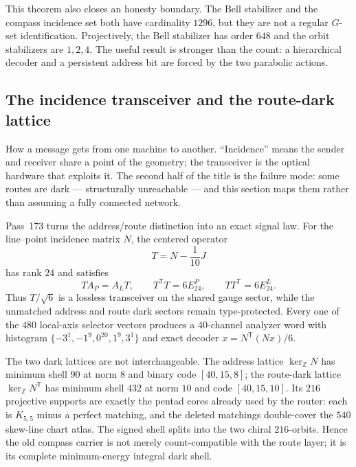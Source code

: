 \documentclass[11pt]{article}
\begin{document}
This theorem also closes an honesty boundary.  The Bell stabilizer and
the compass incidence set both have cardinality $1296$, but they are
not a regular $G$-set identification.  Projectively, the Bell
stabilizer has order $648$ and the orbit stabilizers are $1,2,4$.
The useful result is stronger than the count: a hierarchical decoder
and a persistent address bit are forced by the two parabolic actions.

\subsection{The incidence transceiver and the route-dark lattice}

\begin{plainbox}
How a message gets from one machine to another. ``Incidence'' means the sender and
receiver share a point of the geometry; the transceiver is the optical hardware that
exploits it. The second half of the title is the failure mode: some routes are dark ---
structurally unreachable --- and this section maps them rather than assuming a fully
connected network.
\end{plainbox}

\label{sec:incidence-transceiver-route-dark}

Pass~173 turns the address/route distinction into an exact signal law.
For the line--point incidence matrix $N$, the centered operator
\[
 T=N-\frac1{10}J
\]
has rank $24$ and satisfies
\[
 TA_P=A_LT,
 \qquad T^{\mathsf T}T=6E_{24}^{P},
 \qquad TT^{\mathsf T}=6E_{24}^{L}.
\]
Thus $T/\sqrt6$ is a lossless transceiver on the shared gauge sector,
while the unmatched address and route dark sectors remain type-protected.
Every one of the $480$ local-axis selector vectors produces a
$40$-channel analyzer word with histogram
$\{-3^1,-1^9,0^{20},1^9,3^1\}$ and exact decoder
$x=N^{\mathsf T}(Nx)/6$.

The two dark lattices are not interchangeable.  The address lattice
$\ker_{\mathbb Z}N$ has minimum shell $90$ at norm $8$ and binary code
$[40,15,8]$; the route-dark lattice $\ker_{\mathbb Z}N^{\mathsf T}$ has
minimum shell $432$ at norm $10$ and code $[40,15,10]$.  Its $216$
projective supports are exactly the pentad cores already used by the
router: each is $K_{5,5}$ minus a perfect matching, and the deleted
matchings double-cover the $540$ skew-line chart atlas.  The signed shell
splits into the two chiral $216$-orbits.  Hence the old compass carrier is
not merely count-compatible with the route layer; it is its complete
minimum-energy integral dark shell.
\end{document}

